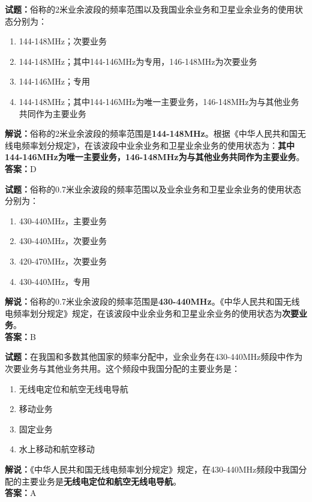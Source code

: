 \documentclass{ctexbook}
\begin{document}
\bigskip




\noindent\textbf{试题：}俗称的2米业余波段的频率范围以及我国业余业务和卫星业余业务的使用状态分别为：
\begin{enumerate}[leftmargin=3em]
\item 144-148\unit{\MHz}；次要业务
\item 144-148\unit{\MHz}；其中144-146\unit{\MHz}为专用，146-148\unit{\MHz}为次要业务
\item 144-146\unit{\MHz}；专用
\item 144-148\unit{\MHz}；其中144-146\unit{\MHz}为唯一主要业务，146-148\unit{\MHz}为与其他业务共同作为主要业务
\end{enumerate}
\noindent\textbf{解说：}俗称的2米业余波段的频率范围是\textbf{144-148\unit{\MHz}}。根据《中华人民共和国无线电频率划分规定》，在该波段中业余业务和卫星业余业务的使用状态为：\textbf{其中144-146\unit{\MHz}为唯一主要业务，146-148\unit{\MHz}为与其他业务共同作为主要业务}。\\\noindent\textbf{答案：}D
\bigskip




\noindent\textbf{试题：}俗称的0.7米业余波段的频率范围以及业余业务和卫星业余业务的使用状态分别为：
\begin{enumerate}[leftmargin=3em]
\item 430-440\unit{\MHz}，主要业务
\item 430-440\unit{\MHz}，次要业务
\item 420-470\unit{\MHz}，次要业务
\item 430-440\unit{\MHz}，专用
\end{enumerate}
\noindent\textbf{解说：}俗称的0.7米业余波段的频率范围是\textbf{430-440\unit{\MHz}}。《中华人民共和国无线电频率划分规定》规定，在该波段中业余业务和卫星业余业务的使用状态为\textbf{次要业务}。\\\noindent\textbf{答案：}B
\bigskip




\noindent\textbf{试题：}在我国和多数其他国家的频率分配中，业余业务在430-440\unit{\MHz}频段中作为次要业务与其他业务共用。这个频段中我国分配的主要业务是：
\begin{enumerate}[leftmargin=3em]
\item 无线电定位和航空无线电导航
\item 移动业务
\item 固定业务
\item 水上移动和航空移动
\end{enumerate}
\noindent\textbf{解说：}《中华人民共和国无线电频率划分规定》规定，在430-440\unit{\MHz}频段中我国分配的主要业务是\textbf{无线电定位和航空无线电导航}。\\\noindent\textbf{答案：}A
\end{document}
